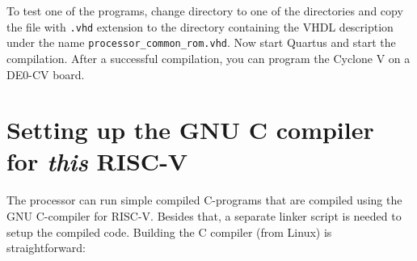 \documentclass[12pt]{article}
\begin{document}
To test one of the programs, change directory to one of the directories and copy the file with \texttt{.vhd} extension to the directory containing the VHDL description under the name \texttt{processor\_common\_rom.vhd}.
Now start Quartus and start the compilation. After a successful compilation, you can program the Cyclone V on a DE0-CV board.

\section{Setting up the GNU C compiler for \textit{this} RISC-V}
\label{sec:ccompiler}
The processor can run simple compiled C-programs that are compiled using the GNU C-compiler for RISC-V. Besides that, a separate linker script is needed to setup the compiled code. Building the C compiler (from Linux) is straightforward:
\end{document}
